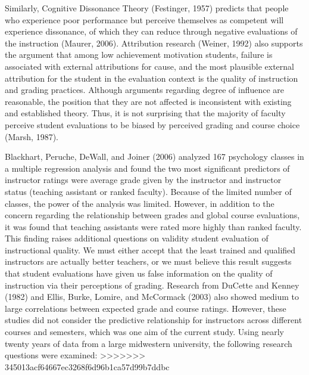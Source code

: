 \documentclass[man]{apa6}
\theoremstyle{definition}
\theoremstyle{definition}
\theoremstyle{definition}
\theoremstyle{remark}
\begin{document}
Similarly, Cognitive Dissonance Theory (Festinger, 1957) predicts that people who experience poor performance but perceive themselves as competent will experience dissonance, of which they can reduce through negative evaluations of the instruction (Maurer, 2006). Attribution research (Weiner, 1992) also supports the argument that among low achievement motivation students, failure is associated with external attributions for cause, and the most plausible external attribution for the student in the evaluation context is the quality of instruction and grading practices. Although arguments regarding degree of influence are reasonable, the position that they are not affected is inconsistent with existing and established theory. Thus, it is not surprising that the majority of faculty perceive student evaluations to be biased by perceived grading and course choice (Marsh, 1987).

Blackhart, Peruche, DeWall, and Joiner (2006) analyzed 167 psychology classes in a multiple regression analysis and found the two most significant predictors of instructor ratings were average grade given by the instructor and instructor status (teaching assistant or ranked faculty). Because of the limited number of classes, the power of the analysis was limited. However, in addition to the concern regarding the relationship between grades and global course evaluations, it was found that teaching assistants were rated more highly than ranked faculty. This finding raises additional questions on validity student evaluation of instructional quality. We must either accept that the least trained and qualified instructors are actually better teachers, or we must believe this result suggests that student evaluations have given us false information on the quality of instruction via their perceptions of grading. Research from DuCette and Kenney (1982) and Ellis, Burke, Lomire, and McCormack (2003) also showed medium to large correlations between expected grade and course ratings. However, these studies did not consider the predictive relationship for instructors across different courses and semesters, which was one aim of the current study. Using nearly twenty years of data from a large midwestern university, the following research questions were examined:
>>>>>>> 345013acf64667ec3268f6d96b1ca57d99b7ddbc
\end{document}
